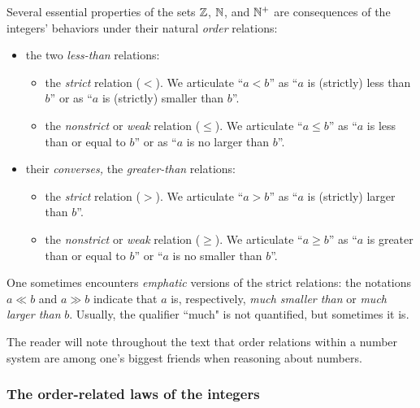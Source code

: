 Several essential properties of the sets $\mathbb{Z}$, $\mathbb{N}$, and $\mathbb{N}^+$ are consequences of the integers' behaviors under their natural {\em order} relations:
\begin{itemize}
\item
the two {\em less-than} relations:
  \begin{itemize}
  \item
the {\em strict} relation ($<$).  We articulate ``$a < b$'' as ``$a$ is (strictly) less than $b$'' or as ``$a$ is (strictly) smaller than $b$''.
  \medskip\item
the {\em nonstrict} or {\em weak} relation ($\leq$).  We articulate ``$a \leq b$'' as ``$a$ is less than or equal to $b$'' or as ``$a$ is no larger than $b$''.
  \end{itemize}
 

\medskip\item
their {\em converses,} the {\em greater-than} relations:
  \begin{itemize}
  \item
the {\em strict} relation ($>$).  We articulate ``$a > b$'' as ``$a$ is (strictly) larger than $b$''.
  \medskip\item
the {\em nonstrict} or {\em weak} relation ($\geq$).  We articulate ``$a \geq b$'' as ``$a$ is greater than or equal to $b$'' or ``$a$ is no smaller than $b$''.
  \end{itemize}
\end{itemize}
One sometimes encounters {\em emphatic} versions of the strict relations: the notations $a \ll b$ and $a \gg b$ indicate that $a$ is, respectively, {\em much smaller than} or {\em much larger than} $b$.  Usually, the qualifier ``much" is not quantified, but sometimes it is.

\smallskip

The reader will note throughout the text that order relations within a number system are among one's biggest friends when reasoning about numbers.  

\subsubsection{The order-related laws of the integers}
\label{sec:order-laws}

